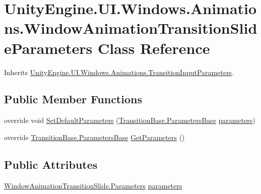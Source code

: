 \hypertarget{class_unity_engine_1_1_u_i_1_1_windows_1_1_animations_1_1_window_animation_transition_slide_parameters}{}\section{Unity\+Engine.\+U\+I.\+Windows.\+Animations.\+Window\+Animation\+Transition\+Slide\+Parameters Class Reference}
\label{class_unity_engine_1_1_u_i_1_1_windows_1_1_animations_1_1_window_animation_transition_slide_parameters}


Inherits \hyperlink{class_unity_engine_1_1_u_i_1_1_windows_1_1_animations_1_1_transition_input_parameters}{Unity\+Engine.\+U\+I.\+Windows.\+Animations.\+Transition\+Input\+Parameters}.

\subsection*{Public Member Functions}
\begin{DoxyCompactItemize}
\item 
override void \hyperlink{class_unity_engine_1_1_u_i_1_1_windows_1_1_animations_1_1_window_animation_transition_slide_parameters_a2640533ffadc0abc624577d621331dee}{Set\+Default\+Parameters} (\hyperlink{class_unity_engine_1_1_u_i_1_1_windows_1_1_animations_1_1_transition_base_1_1_parameters_base}{Transition\+Base.\+Parameters\+Base} \hyperlink{class_unity_engine_1_1_u_i_1_1_windows_1_1_animations_1_1_window_animation_transition_slide_parameters_a687e0afe98e245e57d1da84bc714074a}{parameters})
\item 
override \hyperlink{class_unity_engine_1_1_u_i_1_1_windows_1_1_animations_1_1_transition_base_1_1_parameters_base}{Transition\+Base.\+Parameters\+Base} \hyperlink{class_unity_engine_1_1_u_i_1_1_windows_1_1_animations_1_1_window_animation_transition_slide_parameters_a1f73210f07831eb95f919799559cb29c}{Get\+Parameters} ()
\end{DoxyCompactItemize}
\subsection*{Public Attributes}
\begin{DoxyCompactItemize}
\item 
\hyperlink{class_unity_engine_1_1_u_i_1_1_windows_1_1_animations_1_1_window_animation_transition_slide_1_1_parameters}{Window\+Animation\+Transition\+Slide.\+Parameters} \hyperlink{class_unity_engine_1_1_u_i_1_1_windows_1_1_animations_1_1_window_animation_transition_slide_parameters_a687e0afe98e245e57d1da84bc714074a}{parameters}
\end{DoxyCompactItemize}



